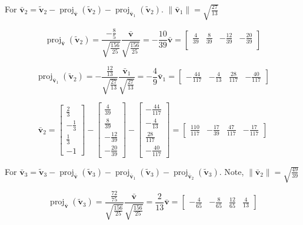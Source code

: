 \documentclass{tufte-book}
\DeclareMathOperator{\proj}{proj}
\newcommand{\vct}{\mathbf}
\theoremstyle{mytheoremstyle}
\theoremstyle{mylemstyle}
\theoremstyle{mydefstyle}
\begin{document}
For $\vct{\bar{v}}_2 = \vct{\tilde{v}}_2 - \proj_{\vct{\bar{v}}}(\vct{\tilde{v}}_2)- \proj_{\vct{\bar{v}}_1}(\vct{\tilde{v}}_2)$.  $\|\vct{\bar{v}}_1\| = \sqrt{\frac{27}{13}}$

\[
\proj_{\vct{\bar{v}}}(\vct{\tilde{v}}_2) = \frac{-\frac{8}{5}}{\sqrt{\frac{156}{25}}} \frac{\vct{\bar{v}}}{\sqrt{\frac{156}{25}}} = -\frac{10}{39} \vct{\bar{v}} =
\begin{bmatrix}
\frac{4}{39} & \frac{8}{39} & -\frac{12}{39} & -\frac{20}{39} \\
\end{bmatrix} 
\]

\[
\proj_{\vct{\bar{v}}_1}(\vct{\tilde{v}}_2) = -\frac{\frac{12}{13}}{\sqrt{\frac{27}{13}}}\frac{\vct{\bar{v}}_1}{\sqrt{\frac{27}{13}}} = -\frac{4}{9}\vct{\bar{v}}_1 
=\begin{bmatrix}
-\frac{44}{117} & -\frac{4}{13} & \frac{28}{117} & -\frac{40}{117}
\end{bmatrix}
\]

\[
\vct{\bar{v}}_2 =
\begin{bmatrix}
\frac{2}{3}\\
-\frac{1}{3}\\
\frac{1}{3}\\
-1
\end{bmatrix}
-
\begin{bmatrix}
\frac{4}{39}\\
\frac{8}{39}\\
-\frac{12}{39}\\
-\frac{20}{39}
\end{bmatrix}
-
\begin{bmatrix}
-\frac{44}{117}\\
-\frac{4}{13}\\
\frac{28}{117}\\
-\frac{40}{117}
\end{bmatrix}
=
\begin{bmatrix}
\frac{110}{117} & -\frac{17}{39} & \frac{47}{117} & -\frac{17}{117} 
\end{bmatrix}
\] 

For $\vct{\bar{v}}_3 = \vct{\tilde{v}}_3 - \proj_{\vct{\bar{v}}}(\vct{\tilde{v}}_3)- \proj_{\vct{\bar{v}}_1}(\vct{\tilde{v}}_3) - \proj_{\vct{\bar{v}}_2}(\vct{\tilde{v}}_3)$. Note, $\|\vct{\bar{v}}_2\| = \sqrt{\frac{49}{39}}$

\[
\proj_{\vct{\bar{v}}}(\vct{\tilde{v}}_3) = \frac{\frac{72}{75}}{\sqrt{\frac{156}{25}}}\frac{\vct{\bar{v}}}{\sqrt{\frac{156}{25}}}=\frac{2}{13}\vct{\bar{v}}=
\begin{bmatrix}
-\frac{4}{65} & -\frac{8}{65} & \frac{12}{65} & \frac{4}{13}
\end{bmatrix}
\]
\end{document}
